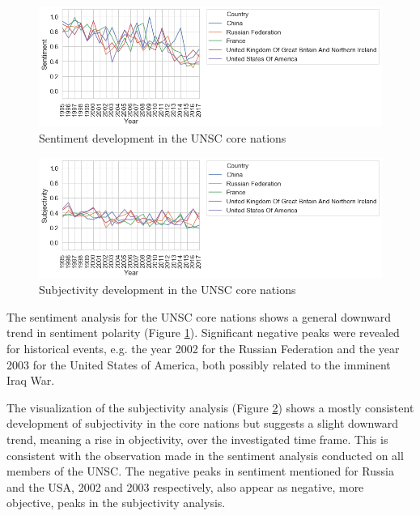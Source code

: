 \begin{figure}[t]
  \centering
  \includegraphics[width=14.75cm]{img/over_time_Vader_Sentiment.png}
  \caption{Sentiment development in the UNSC core nations}
  \label{fig:vadercore}
\end{figure}%

\begin{figure}[t]
  \centering
  \includegraphics[width=14.75cm]{img/over_time_Blob_Subjectivityy.png}
  \caption{Subjectivity development in the UNSC core nations}
  \label{fig:subjcore}
\end{figure}%

The sentiment analysis for the UNSC core nations shows a general downward trend in sentiment polarity (Figure \ref{fig:vadercore}). Significant negative peaks were revealed for historical events, e.g. the year 2002 for the Russian Federation and the year 2003 for the United States of America, both possibly related to the imminent Iraq War.

The visualization of the subjectivity analysis (Figure  \ref{fig:subjcore}) shows a mostly consistent development of subjectivity in the core nations but suggests a slight downward trend, meaning a rise in objectivity, over the investigated time frame. This is consistent with the observation made in %
the sentiment analysis conducted on all members of the UNSC. The negative peaks in sentiment mentioned for Russia and the USA, 2002 and 2003 respectively, also appear as negative, more objective, peaks in the subjectivity analysis.

